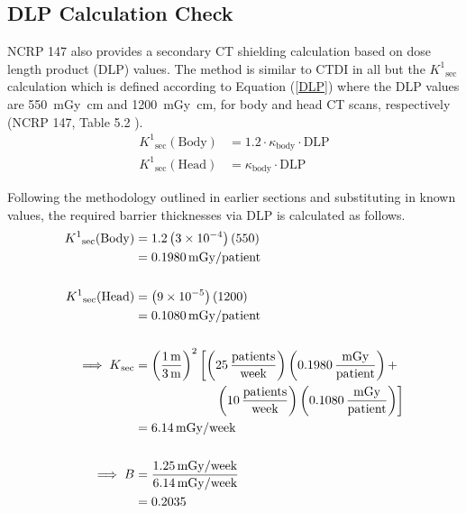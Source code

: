 \documentclass[%
aps,
mph,%
amsmath,amssymb,
preprint,%
tightenlines,
longbibliography,
superscriptaddress,
floatfix,
nofootinbib,
]{revtex4-2}
\begin{document}
    \subsection{DLP Calculation Check} 
        NCRP 147 also provides a secondary CT shielding calculation based on dose length product (DLP) values. The method is similar to CTDI in all but the $K^1\mathrm{_{sec}}$ calculation which is defined according to Equation (\ref{DLP}) where the DLP values are \SI{550}{mGy.cm} and \SI{1200}{mGy.cm}, for body and head CT scans, respectively (NCRP 147, Table 5.2 \cite{national2004ncrp}).
        \begin{align}\label{DLP}
            K^1\mathrm{_{sec}({Body})} &= 1.2 \cdot \kappa\mathrm{_{body}} \cdot \mathrm{DLP}\\
            K^1\mathrm{_{sec}(Head)} &= \kappa\mathrm{_{body}}\cdot \mathrm{DLP}
        \end{align}
        
        Following the methodology outlined in earlier sections and substituting in known values, the required barrier thicknesses via DLP is calculated as follows. 
        \begin{equation}
        \begin{aligned} \nonumber
            K^1\mathrm{_{sec}({Body})} &= 1.2 \left(3 \times 10^{-4}\right) (550) \\
            &= \qty{0.1980}{mGy/patient}\\ \\
            K^1\mathrm{_{sec}({Head})} &= \left(9 \times 10^{-5} \right) (1200) \\
            &= \qty{0.1080}{mGy/patient}\\ \\
            \implies K\mathrm{_{sec}} &= \left(\frac{\qty{1}{m}}{\qty{3}{m}}\right)^2  \left[ \left( \qty{25}{\frac{patients}{week}}\right)\left(\SI{0.1980}{\frac{mGy}{patient}}\right)+ \right.\\
            & \hspace{63.25pt} \left.\left(  \qty{10}{\frac{patients}{week}}\right)\left(\SI{0.1080}{\frac{mGy}{patient}}\right) \right]\\
            &= \qty{6.14}{mGy/week}\\ \\
            \implies B &= \frac{\qty{1.25}{mGy/week}}{\qty{6.14}{mGy/week}} \\
            &= 0.2035
        \end{aligned}
        \end{equation}
        
\end{document}
